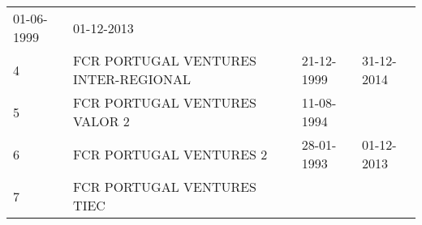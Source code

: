 \documentclass[]{book}
\theoremstyle{definition}
\theoremstyle{definition}
\theoremstyle{definition}
\theoremstyle{remark}
\begin{document}
\begin{longtable}[]{@{}llll@{}}
\begin{minipage}[t]{0.17\columnwidth}
01-06-1999\strut
\end{minipage} & \begin{minipage}[t]{0.17\columnwidth}\raggedright\strut
01-12-2013\strut
\end{minipage}\tabularnewline
\begin{minipage}[t]{0.17\columnwidth}\raggedright\strut
4\strut
\end{minipage} & \begin{minipage}[t]{0.17\columnwidth}\raggedright\strut
FCR PORTUGAL VENTURES INTER-REGIONAL\strut
\end{minipage} & \begin{minipage}[t]{0.17\columnwidth}\raggedright\strut
21-12-1999\strut
\end{minipage} & \begin{minipage}[t]{0.17\columnwidth}\raggedright\strut
31-12-2014\strut
\end{minipage}\tabularnewline
\begin{minipage}[t]{0.17\columnwidth}\raggedright\strut
5\strut
\end{minipage} & \begin{minipage}[t]{0.17\columnwidth}\raggedright\strut
FCR PORTUGAL VENTURES VALOR 2\strut
\end{minipage} & \begin{minipage}[t]{0.17\columnwidth}\raggedright\strut
11-08-1994\strut
\end{minipage}\tabularnewline
\begin{minipage}[t]{0.17\columnwidth}\raggedright\strut
6\strut
\end{minipage} & \begin{minipage}[t]{0.17\columnwidth}\raggedright\strut
FCR PORTUGAL VENTURES 2\strut
\end{minipage} & \begin{minipage}[t]{0.17\columnwidth}\raggedright\strut
28-01-1993\strut
\end{minipage} & \begin{minipage}[t]{0.17\columnwidth}\raggedright\strut
01-12-2013\strut
\end{minipage}\tabularnewline
\begin{minipage}[t]{0.17\columnwidth}\raggedright\strut
7\strut
\end{minipage} & \begin{minipage}[t]{0.17\columnwidth}\raggedright\strut
FCR PORTUGAL VENTURES TIEC\strut
\end{minipage} & \begin{minipage}[t]{0.17\columnwidth}\raggedright\strut

\end{minipage}
\end{longtable}
\end{document}

